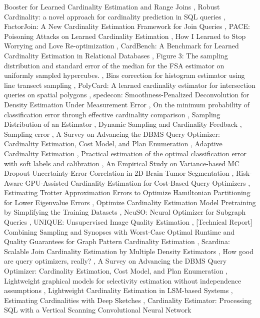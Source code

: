 \documentclass{article}
\begin{document}
Booster for Learned Cardinality Estimation and Range Joins \cite{gjurovski2024gridar59dc1a93}, Robust Cardinality: a novel approach for cardinality prediction in SQL queries \cite{praciano2021robustf84bf690}, FactorJoin: A New Cardinality Estimation Framework for Join Queries \cite{wu2022factorjoin04384084}, PACE: Poisoning Attacks on Learned Cardinality Estimation \cite{zhang2024pace9008db59}, How I Learned to Stop Worrying and Love Re-optimization \cite{perron2019how75957e6c}, CardBench: A Benchmark for Learned Cardinality Estimation in Relational Databases \cite{chronis2024cardbench7c802c5f}, Figure 3: The sampling distribution and standard error of the median for the FSA estimator on uniformly sampled hypercubes. \cite{paperndfigure52625aa8}, Bias correction for histogram estimator using line transect sampling \cite{eidous2004bias8c1b215e}, PolyCard: A learned cardinality estimator for intersection queries on spatial polygons \cite{ji2025polycard5d00a145}, spedecon: Smoothness-Penalized Deconvolution for Density Estimation Under Measurement Error \cite{kent2024spedecon71205b04}, On the minimum probability of classification error through effective cardinality comparison \cite{montalvo2016minimum22d8e93d}, Sampling Distribution of an Estimator \cite{paper2007sampling2c2c591b}, Dynamic Sampling and Cardinality Feedback \cite{charalambides2013dynamic6e398816}, Sampling error \cite{evans2019sampling4eaea052}, A Survey on Advancing the DBMS Query Optimizer: Cardinality Estimation, Cost Model, and Plan Enumeration \cite{lan2021survey9714451f}, Adaptive Cardinality Estimation \cite{ivanov2017adaptive5676756b}, Practical estimation of the optimal classification error with soft labels and calibration \cite{ushio2025practical29f9f7f9}, An Empirical Study on Variance-based MC Dropout Uncertainty-Error Correlation in 2D Brain Tumor Segmentation \cite{b2025empirical5e285d35}, Risk-Aware GPU-Assisted Cardinality Estimation for Cost-Based Query Optimizers \cite{chang2025riskaware3f5cdadc}, Estimating Trotter Approximation Errors to Optimize Hamiltonian Partitioning for Lower Eigenvalue Errors \cite{mehendale2023estimating6dee8709}, Optimize Cardinality Estimation Model Pretraining by Simplifying the Training Datasets \cite{fang2025optimize06730f4f}, NeuSO: Neural Optimizer for Subgraph Queries \cite{yang2025neusof658da12}, UNIQUE: Unsupervised Image Quality Estimation \cite{temel2018unique32abcdfe}, [Technical Report] Combining Sampling and Synopses with Worst-Case Optimal Runtime and Quality Guarantees for Graph Pattern Cardinality Estimation \cite{kim2021technicalac8a1df2}, Scardina: Scalable Join Cardinality Estimation by Multiple Density Estimators \cite{ito2023scardinacd44851c}, How good are query optimizers, really? \cite{leis2015how6626e333}, A Survey on Advancing the DBMS Query Optimizer: Cardinality Estimation, Cost Model, and Plan Enumeration \cite{lan2021survey7fd7278c}, Lightweight graphical models for selectivity estimation without independence assumptions \cite{tzoumas2011lightweightaf2b10fe}, Lightweight Cardinality Estimation in LSM-based Systems \cite{absalyamov2018lightweightdaa04462}, Estimating Cardinalities with Deep Sketches \cite{kipf2019estimating6b1df6f0}, Cardinality Estimator: Processing SQL with a Vertical Scanning Convolutional Neural Network 
\end{document}
